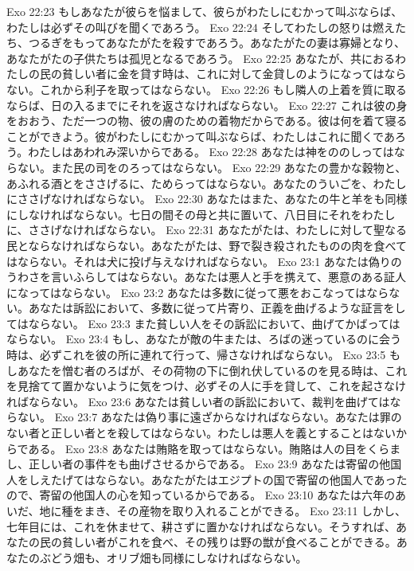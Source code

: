 Exo 22:23  もしあなたが彼らを悩まして、彼らがわたしにむかって叫ぶならば、わたしは必ずその叫びを聞くであろう。
Exo 22:24  そしてわたしの怒りは燃えたち、つるぎをもってあなたがたを殺すであろう。あなたがたの妻は寡婦となり、あなたがたの子供たちは孤児となるであろう。
Exo 22:25  あなたが、共におるわたしの民の貧しい者に金を貸す時は、これに対して金貸しのようになってはならない。これから利子を取ってはならない。
Exo 22:26  もし隣人の上着を質に取るならば、日の入るまでにそれを返さなければならない。
Exo 22:27  これは彼の身をおおう、ただ一つの物、彼の膚のための着物だからである。彼は何を着て寝ることができよう。彼がわたしにむかって叫ぶならば、わたしはこれに聞くであろう。わたしはあわれみ深いからである。
Exo 22:28  あなたは神をののしってはならない。また民の司をのろってはならない。
Exo 22:29  あなたの豊かな穀物と、あふれる酒とをささげるに、ためらってはならない。あなたのういごを、わたしにささげなければならない。
Exo 22:30  あなたはまた、あなたの牛と羊をも同様にしなければならない。七日の間その母と共に置いて、八日目にそれをわたしに、ささげなければならない。
Exo 22:31  あなたがたは、わたしに対して聖なる民とならなければならない。あなたがたは、野で裂き殺されたものの肉を食べてはならない。それは犬に投げ与えなければならない。
Exo 23:1  あなたは偽りのうわさを言いふらしてはならない。あなたは悪人と手を携えて、悪意のある証人になってはならない。
Exo 23:2  あなたは多数に従って悪をおこなってはならない。あなたは訴訟において、多数に従って片寄り、正義を曲げるような証言をしてはならない。
Exo 23:3  また貧しい人をその訴訟において、曲げてかばってはならない。
Exo 23:4  もし、あなたが敵の牛または、ろばの迷っているのに会う時は、必ずこれを彼の所に連れて行って、帰さなければならない。
Exo 23:5  もしあなたを憎む者のろばが、その荷物の下に倒れ伏しているのを見る時は、これを見捨てて置かないように気をつけ、必ずその人に手を貸して、これを起さなければならない。
Exo 23:6  あなたは貧しい者の訴訟において、裁判を曲げてはならない。
Exo 23:7  あなたは偽り事に遠ざからなければならない。あなたは罪のない者と正しい者とを殺してはならない。わたしは悪人を義とすることはないからである。
Exo 23:8  あなたは賄賂を取ってはならない。賄賂は人の目をくらまし、正しい者の事件をも曲げさせるからである。
Exo 23:9  あなたは寄留の他国人をしえたげてはならない。あなたがたはエジプトの国で寄留の他国人であったので、寄留の他国人の心を知っているからである。
Exo 23:10  あなたは六年のあいだ、地に種をまき、その産物を取り入れることができる。
Exo 23:11  しかし、七年目には、これを休ませて、耕さずに置かなければならない。そうすれば、あなたの民の貧しい者がこれを食べ、その残りは野の獣が食べることができる。あなたのぶどう畑も、オリブ畑も同様にしなければならない。
